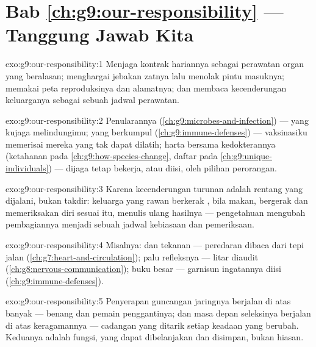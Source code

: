 \section*{Bab \ref{ch:g9:our-responsibility} --- Tanggung Jawab Kita}

\begin{solution}{exo:g9:our-responsibility:1}
Menjaga kontrak hariannya sebagai perawatan organ yang
beralasan; menghargai jebakan zatnya lalu menolak pintu
masuknya; memakai peta reproduksinya dan alamatnya; dan
membaca kecenderungan keluarganya sebagai sebuah jadwal
perawatan.
\end{solution}

\begin{solution}{exo:g9:our-responsibility:2}
Penularannya (\cref{ch:g9:microbes-and-infection}) ---
 yang kujaga melindungimu;  yang berkumpul
(\cref{ch:g9:immune-defenses}) --- vaksinasiku memerisai
mereka yang tak dapat dilatih; harta bersama kedokterannya
(ketahanan pada \cref{ch:g9:how-species-change}, daftar 
pada \cref{ch:g9:unique-individuals}) --- dijaga tetap
bekerja, atau diisi, oleh pilihan perorangan.
\end{solution}

\begin{solution}{exo:g9:our-responsibility:3}
Karena kecenderungan turunan adalah rentang yang dijalani,
bukan takdir: keluarga yang rawan berkerak , bila
makan, bergerak dan memeriksakan diri sesuai itu, menulis
ulang hasilnya --- pengetahuan mengubah pembagiannya menjadi
sebuah jadwal kebiasaan dan pemeriksaan.
\end{solution}

\begin{solution}{exo:g9:our-responsibility:4}
Misalnya:  dan tekanan  --- peredaran
 dibaca dari tepi jalan
(\cref{ch:g7:heart-and-circulation}); palu refleksnya ---
litar  diaudit (\cref{ch:g8:nervous-communication});
buku besar  --- garnisun ingatannya diisi
(\cref{ch:g9:immune-defenses}).
\end{solution}

\begin{solution}{exo:g9:our-responsibility:5}
Penyerapan guncangan jaringnya berjalan di atas banyak
 --- benang dan pemain penggantinya; dan masa depan
seleksinya berjalan di atas keragamannya --- cadangan yang
ditarik setiap keadaan yang berubah. Keduanya adalah fungsi,
yang dapat dibelanjakan dan disimpan, bukan hiasan.
\end{solution}

